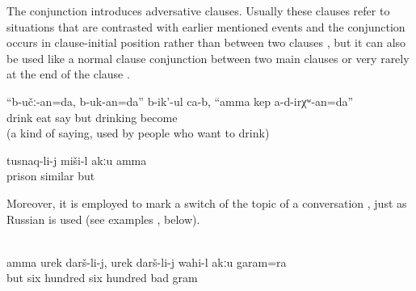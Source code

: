 The conjunction   introduces adversative clauses. Usually these clauses refer to situations that are contrasted with earlier mentioned events and the conjunction occurs in clause-initial position rather than between two clauses , but it can also be used like a normal clause conjunction between two main clauses  or very rarely at the end of the clause .
%
\begin{exe}
	\ex	\label{ex:‎They say, We will drink and eat, but not until we become drunk minor}
	\gll	``b-učː-an=da,	b-uk-an=da''	b-ik'-ul	ca-b,	``amma	kep	a-d-irχʷ-an=da''\\
		drink	eat	say		but	drinking	become\\
	\glt	{} (a kind of saying, used by people who want to drink)

	\ex	\label{ex:‎But isn't this similar to a prison minor}
	\gll	tusnaq-li-j	miši-l	akːu	amma\\
		prison	similar		but\\
	\glt	{}
\end{exe}

Moreover, it is employed to mark a switch of the topic of a conversation , just as Russian  is used (see examples ,  below).
%
\begin{exe}
	\\\label{ex:‎But for 600, for 600, that is not bad at all minor}
	\gll	amma	urek	darš-li-j,	urek	darš-li-j	wahi-l	akːu	garam=ra\\
		but	six	hundred	six	hundred	bad		gram\\
	\glt	{}
\end{exe}

